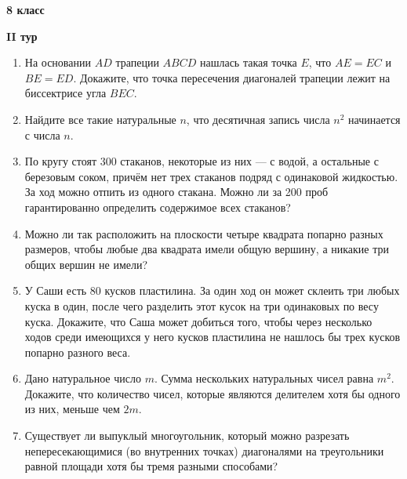 \documentclass{article}
\begin{document}
\large
	
\begin{center}
	\LARGE\textbf{8 класс}
\end{center}
\begin{center}
	\large\textbf{II тур}
\end{center}

\begin{enumerate}[label*=\textbf{\arabic{enumi}.}]
\setcounter{enumi}{0}
\item На основании $AD$ трапеции $ABCD$ нашлась такая точка $E$, что $AE = EC$ и $BE = ED$. Докажите, что точка пересечения диагоналей трапеции лежит на биссектрисе угла $BEC$.

\item Найдите все такие натуральные $n$, что десятичная запись числа $n^2$ начинается с числа $n$.

\item По кругу стоят 300 стаканов, некоторые из них --- с водой, а остальные с березовым соком, причём нет трех стаканов подряд с одинаковой жидкостью. За ход можно отпить из одного стакана. Можно ли за 200 проб гарантированно определить содержимое всех стаканов?

\item Можно ли так расположить на плоскости четыре квадрата попарно разных размеров, чтобы любые два квадрата имели общую вершину, а никакие три общих вершин не имели?

\item У Саши есть 80 кусков пластилина. За один ход он может склеить три любых куска в один, после чего разделить этот кусок на три одинаковых по весу куска.
Докажите, что Саша может добиться того, чтобы через несколько ходов среди имеющихся у него кусков пластилина не нашлось бы трех кусков попарно разного веса.

\item Дано натуральное число $m$. Сумма нескольких натуральных чисел равна $m^2$. Докажите, что количество чисел, которые являются делителем хотя бы одного из них, меньше чем $2m$.

\item Существует ли выпуклый многоугольник, который можно разрезать непересекающимися (во внутренних точках) диагоналями на треугольники равной площади хотя бы тремя разными способами?

\end{enumerate}
\end{document}
